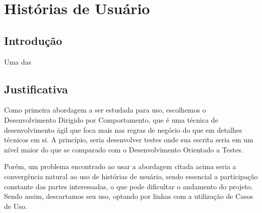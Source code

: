 \chapter{Histórias de Usuário}

\section{Introdução}
Uma das \cite{jonathanrasmusson}

\section{Justificativa}
Como primeira abordagem a ser estudada para uso, escolhemos o Desenvolvimento Dirigido por Comportamento, que é uma técnica de desenvolvimento ágil que foca mais nas regras de negócio do que em detalhes técnicos em si. A princípio, seria desenvolver testes onde sua escrita seria em um nível maior do que se comparado com o Desenvolvimento Orientado a Testes.

Porém, um problema encontrado ao usar a abordagem citada acima seria a convergência natural ao uso de histórias de usuário, sendo essencial a participação constante das partes interessadas, o que pode dificultar o andamento do projeto. Sendo assim, descartamos seu uso, optando por linhas com a utilização de Casos de Uso.

